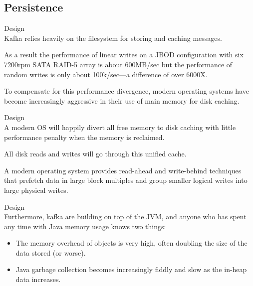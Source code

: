 \subsection{Persistence}
\begin{frame}[plain,t]{Design} %
     \\
    \vspace{2ex}
    Kafka relies heavily on the filesystem for storing and caching messages. 
    
    \vspace{2ex}
    As a result the performance of linear writes on a JBOD configuration with six 7200rpm SATA RAID-5 array is about 600MB/sec but the performance of random writes is only about 100k/sec—a difference of over 6000X. 
    
    \vspace{2ex}
    To compensate for this performance divergence, modern operating systems have become increasingly aggressive in their use of main memory for disk caching.
    
    
    
    
\end{frame}
\begin{frame}[plain,t]{Design} %
     \\
    \vspace{2ex}
    A modern OS will happily divert all free memory to disk caching with little performance penalty when the memory is reclaimed.
    
    \vspace{2ex}
    All disk reads and writes will go through this unified cache. 
    
    \vspace{2ex}
    A modern operating system provides read-ahead and write-behind techniques that prefetch data in large block multiples and group smaller logical writes into large physical writes.
    
    
\end{frame}
\begin{frame}[plain,t]{Design} %
     \\
    \vspace{2ex}
    Furthermore, kafka are building on top of the JVM, and anyone who has spent any time with Java memory usage knows two things:
    \begin{itemize}
        \item The memory overhead of objects is very high, often doubling the size of the data stored (or worse).
        \item  Java garbage collection becomes increasingly fiddly and slow as the in-heap data increases.
    \end{itemize}
    
    
   
    
    
\end{frame}
